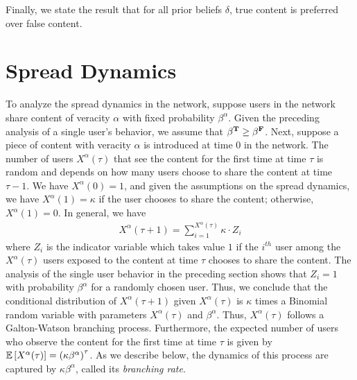 Finally, we state the result that for all prior beliefs $\delta$,  true content is preferred over false content. 


\section{Spread Dynamics}\label{sec:spread-equilibrium}
To analyze the spread dynamics in the network, suppose users in the network share content of veracity $\alpha$ with fixed probability $\beta^\alpha$. Given the preceding analysis of a single user's behavior, we assume that $\beta^{\mathbf{T}} \geq \beta^{\mathbf{F}}$. Next, suppose a piece of content with veracity $\alpha$ is introduced at time $0$ in the network. The number of users $X^{\alpha}(\tau)$ that see the content for the first time at time $\tau$ is random and depends on how many users choose to share the content at time $\tau - 1$. We have $X^\alpha(0) = 1$, and given the assumptions on the spread dynamics, we have $X^\alpha(1) = \kappa$ if the user chooses to share the content; otherwise, $X^\alpha(1) = 0$. In general, we have 
\begin{align} \label{eq:branching_process}
    X^{\alpha}(\tau + 1) =\sum_{i= 1}^{X^{\alpha}(\tau)} {\kappa \cdot Z_i}
\end{align} 
where $Z_i$ is the indicator variable which takes value $1$ if the $i^{th}$ user among the $X^{\alpha}(\tau)$ users exposed to the content at time $\tau$ chooses to share the content. The analysis of the single user behavior in the preceding section shows that $Z_i = 1$ with probability $\beta^{\alpha}$ for a randomly chosen user. Thus, we conclude that the conditional distribution of $X^{\alpha}(\tau + 1)$ given $X^{\alpha}(\tau)$ is $\kappa$ times a Binomial random variable with parameters $X^{\alpha}(\tau)$ and $\beta^{\alpha}$. Thus, $X^{\alpha}(\tau)$ follows a Galton-Watson branching process. %
Furthermore, the expected number of users who observe the content for the first time at time $\tau$ is given by $\mathbb{E}\left[ X^\alpha(\tau)\right] = {(\kappa \beta^\alpha)}^\tau$. As we describe below, the dynamics of this process are captured by $\kappa\beta^{\alpha}$, called its {\em branching rate}.


